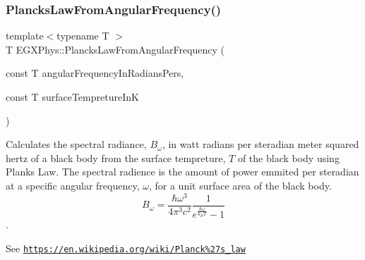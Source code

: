 \subsubsection{\texorpdfstring{Plancks\+Law\+From\+Angular\+Frequency()}{PlancksLawFromAngularFrequency()}}
{\footnotesize\ttfamily template$<$typename T $>$ \\
T E\+G\+X\+Phys\+::\+Plancks\+Law\+From\+Angular\+Frequency (\begin{DoxyParamCaption}\item[{const T}]{angular\+Frequency\+In\+Radians\+Pers,  }\item[{const T}]{surface\+Tempreture\+InK }\end{DoxyParamCaption})}



Calculates the spectral radiance, $B_{\omega}$, in watt radians per steradian meter squared hertz of a black body from the surface tempreture, $T$ of the black body using Plank\textquotesingle{}s Law. The spectral radience is the amount of power emmited per steradian at a specific angular frequency, $\omega$, for a unit surface area of the black body. \[ B_{\omega} = \dfrac{\hbar \omega^3}{4\pi^3c^2} \dfrac{1}{e^{\frac{\hbar\omega}{k_B T}} - 1} \]. 

See \href{https://en.wikipedia.org/wiki/Planck%27s_law}{\tt https\+://en.\+wikipedia.\+org/wiki/\+Planck\%27s\+\_\+law}


